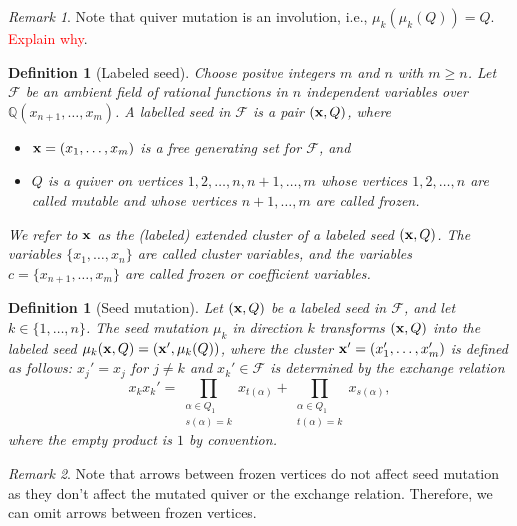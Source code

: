 \documentclass[12pt]{amsart}
\newtheorem{definition}[theorem]{Definition}
\theoremstyle{remark}
\newtheorem*{remark}{Remark}
\theoremstyle{remark}
\begin{document}
\begin{remark}
Note that quiver mutation is an involution, i.e., $\mu_k(\mu_k(Q)) = Q$.
\textcolor{red}{Explain why}.
\end{remark}

\begin{definition}[Labeled seed]
Choose positve integers $m$ and $n$ with $m \ge n$.
Let $\mathcal{F}$ be an \emph{ambient field} of rational functions in $n$ independent variables over $\mathbb{Q}(x_{n+1}, \ldots, x_m)$.
A labelled seed in $\mathcal{F}$ is a pair $(\bold x, Q)$, where
\begin{itemize}
\item
$\bold x = (x_1, \ldots, x_m)$ is a free generating set for $\mathcal{F}$, and

\item
$Q$ is a quiver on vertices $1, 2, \ldots, n, n+1, \ldots, m$ whose vertices $1, 2, \ldots, n$ are called \emph{mutable} and whose vertices $n+1, \ldots, m$ are called \emph{frozen}.
\end{itemize}
We refer to $\bold x$ as the (labeled) \emph{extended cluster} of a labeled seed $(\bold x, Q)$.
The variables $\{x_1, \ldots, x_n\}$ are called \emph{cluster variables}, and the variables $c = \{x_{n+1}, \ldots, x_m\}$ are called \emph{frozen} or \emph{coefficient variables}.
\end{definition}

\begin{definition}[Seed mutation]
Let $(\bold x, Q)$ be a labeled seed in $\mathcal{F}$, and let $k \in \{1, \ldots, n\}$.
The \emph{seed mutation} $\mu_k$ in direction $k$ transforms $(\bold x, Q)$ into the labeled seed $\mu_k(\bold x, Q) = (\bold x', \mu_k(Q))$, where the cluster $\bold x' = (x_1', \ldots, x_m')$ is defined as follows:
$x_j' = x_j$ for $j \ne k$ and $x_k' \in \mathcal{F}$ is determined by the \emph{exchange relation}
$$x_k x_k' = \prod_{\substack{\alpha \in Q_1 \\ s(\alpha) = k}} x_{t(\alpha)} + \prod_{\substack{\alpha \in Q_1 \\ t(\alpha) = k}} x_{s(\alpha)},$$
where the empty product is $1$ by convention.
\end{definition}

\begin{remark}
Note that arrows between frozen vertices do not affect seed mutation as they don't affect the mutated quiver or the exchange relation.
Therefore, we can omit arrows between frozen vertices.
\end{remark}
\end{document}
